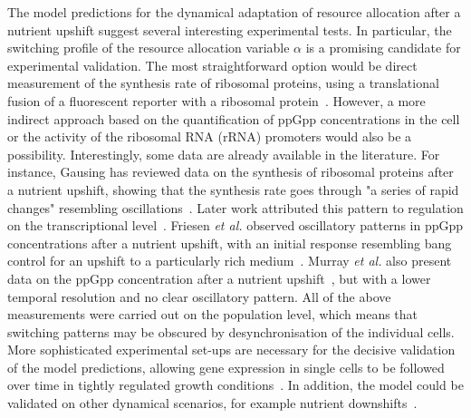 The model predictions for the dynamical adaptation of resource allocation after a nutrient upshift suggest several interesting experimental tests.
In particular, the switching profile of the resource allocation variable $\alpha$ is a promising candidate for experimental validation. 
The most straightforward option would be direct measurement of the synthesis rate of ribosomal proteins, using a translational fusion of a fluorescent reporter with a ribosomal protein~\cite{bakshi_superresolution_2012,english_singlemolecule_2011}.
However, a more indirect approach based on the quantification of ppGpp concentrations in the cell or the activity of the ribosomal RNA (rRNA) promoters would also be a possibility.
Interestingly, some data are already available in the literature.
For instance, Gausing has reviewed data on the synthesis of ribosomal proteins after a nutrient upshift, showing that the synthesis rate goes through "a series of rapid changes" resembling oscillations~\cite{gausing_regulation_1980}.
Later work attributed this pattern to regulation on the transcriptional level~\cite{zengel_transcription_1986}.
Friesen \textit{et al.} observed oscillatory patterns in ppGpp concentrations after a nutrient upshift, with an initial response resembling bang control for an upshift to a particularly rich medium~\cite{friesen_synthesis_1975}.
Murray \textit{et al.} also present data on the ppGpp concentration after a nutrient upshift~\cite{murray_control_2003}, but with a lower temporal resolution and no clear oscillatory pattern.
All of the above measurements were carried out on the population level, which means that switching patterns may be obscured by desynchronisation of the individual cells.
More sophisticated experimental set-ups are necessary for the decisive validation of the model predictions, allowing gene expression in single cells to be followed over time in tightly regulated growth conditions~\cite{young_measuring_2011,duncombe_microfluidics_2015}.
In addition, the model could be validated on other dynamical scenarios, for example nutrient downshifts~\cite{molin_control_1977,murray_control_2003}.

